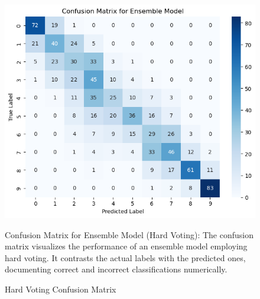 \documentclass{article}
\begin{document}
\begin{figure}[htbp]
    \centering
    
    
    \begin{minipage}{\textwidth}
        \centering
        \caption{Hard Voting Confusion Matrix}
        \includegraphics[scale=0.5]{ConfusionMAtrixHardClassVoting.png}
    \end{minipage}
    Confusion Matrix for Ensemble Model (Hard Voting): The confusion matrix visualizes the performance of an ensemble model employing hard voting. It contrasts the actual labels with the predicted ones, documenting correct and incorrect classifications numerically.


\end{figure}
\end{document}
